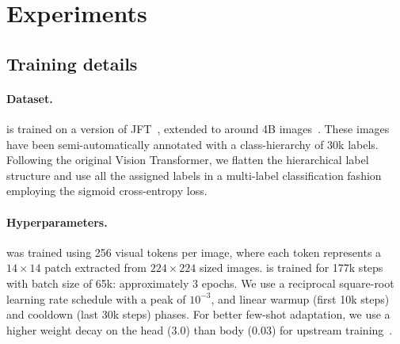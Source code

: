 \section{Experiments}
\label{sec:evaluation}

\subsection{Training details}
\label{sec:training}
\paragraph{Dataset.}
\chonk is trained on a version of JFT~\citep{sun2017revisiting}, extended to around 4B images~\citep{zhai2022scaling}.
These images have been semi-automatically annotated with a class-hierarchy of 30k labels.
Following the original Vision Transformer, we flatten the hierarchical label structure and use all the assigned labels in a multi-label classification fashion employing the sigmoid cross-entropy loss.

\paragraph{Hyperparameters.}
\chonk was trained using 256 visual tokens per image, where each token represents a $14 \times 14$ patch extracted from $224 \times 224$ sized images. 
\chonk is trained for 177k steps with batch size of 65k: approximately 3 epochs.
We use a reciprocal square-root learning rate schedule with a peak of $10^{-3}$, and linear warmup (first 10k steps) and cooldown (last 30k steps) phases. For better few-shot adaptation, we use a higher weight decay on the head ($3.0$) than body ($0.03$) for upstream training~\citep{zhai2022scaling, abnar2021exploring}. 







